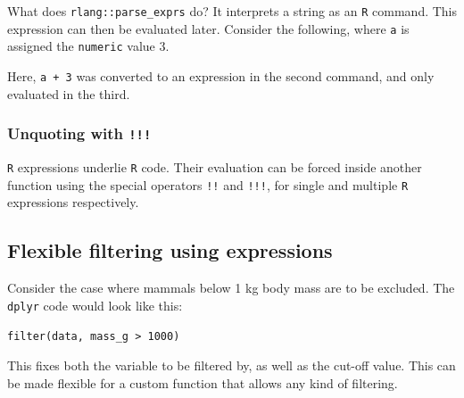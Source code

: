 \documentclass[]{book}
\newenvironment{Shaded}{}{}
\newcommand{\CommentTok}[1]{\textcolor[rgb]{0.38,0.63,0.69}{\textit{#1}}}
\newcommand{\DecValTok}[1]{\textcolor[rgb]{0.25,0.63,0.44}{#1}}
\newcommand{\KeywordTok}[1]{\textcolor[rgb]{0.00,0.44,0.13}{\textbf{#1}}}
\newcommand{\NormalTok}[1]{#1}
\newcommand{\OperatorTok}[1]{\textcolor[rgb]{0.40,0.40,0.40}{#1}}
\newcommand{\StringTok}[1]{\textcolor[rgb]{0.25,0.44,0.63}{#1}}
\begin{document}
What does \texttt{rlang::parse\_exprs} do? It interprets a string as an \texttt{R} command.
This expression can then be evaluated later. Consider the following, where \texttt{a} is assigned the \texttt{numeric} value 3.

\begin{Shaded}
\end{Shaded}

Here, \texttt{a\ +\ 3} was converted to an expression in the second command, and only evaluated in the third.

\hypertarget{unquoting-with}{%
\subsubsection*{\texorpdfstring{Unquoting with \texttt{!!!}}{Unquoting with !!!}}\label{unquoting-with}}

\texttt{R} expressions underlie \texttt{R} code. Their evaluation can be forced inside another function using the special operators \texttt{!!} and \texttt{!!!}, for single and multiple \texttt{R} expressions respectively.

\hypertarget{flexible-filtering-using-expressions}{%
\subsection{Flexible filtering using expressions}\label{flexible-filtering-using-expressions}}

Consider the case where mammals below 1 kg body mass are to be excluded. The \texttt{dplyr} code would look like this:

\texttt{filter(data,\ mass\_g\ \textgreater{}\ 1000)}

This fixes both the variable to be filtered by, as well as the cut-off value. This can be made flexible for a custom function that allows any kind of filtering.
\end{document}
